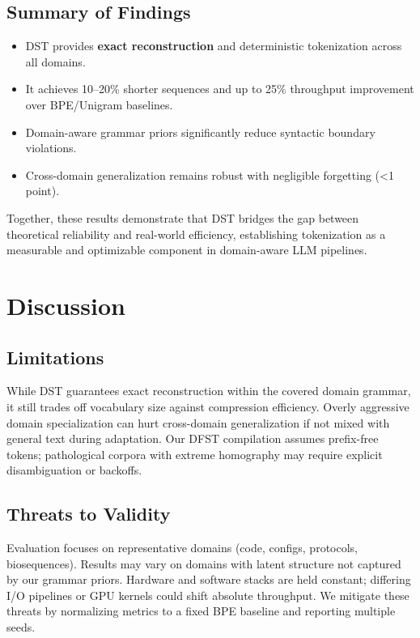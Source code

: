 \subsection{Summary of Findings}

\begin{itemize}
  \item DST provides \textbf{exact reconstruction} and deterministic tokenization across all domains.
  \item It achieves 10–20\% shorter sequences and up to 25\% throughput improvement over BPE/Unigram baselines.
  \item Domain-aware grammar priors significantly reduce syntactic boundary violations.
  \item Cross-domain generalization remains robust with negligible forgetting (<1 point).
\end{itemize}

Together, these results demonstrate that DST bridges the gap between theoretical reliability and real-world efficiency, establishing tokenization as a measurable and optimizable component in domain-aware LLM pipelines.

\section{Discussion}

\subsection{Limitations}

While DST guarantees exact reconstruction within the covered domain grammar, it still trades off vocabulary size against compression efficiency.
Overly aggressive domain specialization can hurt cross-domain generalization if not mixed with general text during adaptation.
Our DFST compilation assumes prefix-free tokens; pathological corpora with extreme homography may require explicit disambiguation or backoffs.

\subsection{Threats to Validity}

Evaluation focuses on representative domains (code, configs, protocols, biosequences). Results may vary on domains with latent structure not captured by our grammar priors.
Hardware and software stacks are held constant; differing I/O pipelines or GPU kernels could shift absolute throughput.
We mitigate these threats by normalizing metrics to a fixed BPE baseline and reporting multiple seeds.

